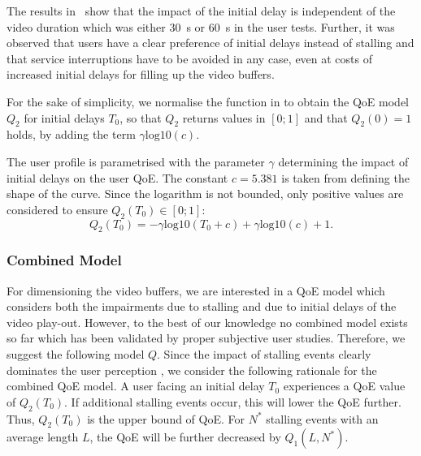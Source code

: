 The results in~\cite{Hossfeld2012c} show that the impact of the initial delay is independent of the video duration which was either \SI{30}{\second} or \SI{60}{\second} in the user tests.
Further, it was observed that users have a clear preference of initial delays instead
of stalling and that service interruptions have to be avoided in any case, even at costs of increased initial delays for filling up the video buffers.

For the sake of simplicity, we normalise the function in  to obtain the \gls{QoE} model \(Q_2\) for initial delays \(T_0\), so that \(Q_2\) returns values in \(\left[0;1\right]\) and that \(Q_2(0)=1\) holds, by adding the term \(\gamma \mathrm{log10}\left(c\right)\).

The user profile is parametrised with the parameter \(\gamma\) determining the impact of initial delays on the user \gls{QoE}.
The constant \(c=5.381\) is taken from  defining the shape of the curve.
Since the logarithm is not bounded, only positive values are considered to ensure \(Q_2(T_0) \in [0;1]\):
\begin{equation*}
Q_2(T_0)= -\gamma \mathrm{log10}\left(T_0 + c\right) + \gamma \mathrm{log10}\left(c\right)+ 1.
\end{equation*}

\subsubsection*{Combined  Model}\label{sec:application:qoe_user_behaviour:typical_user_scenarios:youtube_qoe:combined}
For dimensioning the video buffers, we are interested in a \gls{QoE} model which considers both the impairments due to stalling and due to initial delays of the video play-out.
However, to the best of our knowledge no combined model exists so far which has been validated by proper subjective user studies.
Therefore, we suggest the following model \(Q\).
Since the impact of stalling events clearly dominates the user perception \cite{Hossfeld2012a,Hossfeld2012c}, we consider the following rationale for the combined QoE model.
A user facing an initial delay \(T_0\) experiences a \gls{QoE} value of \(Q_2(T_0)\).
If additional stalling events occur, this will lower the QoE further.
Thus, \(Q_2(T_0)\) is the upper bound of \gls{QoE}.
For \(N^*\) stalling events with an average length \(L\), the \gls{QoE} will be further decreased by \(Q_1(L,N^*)\).

